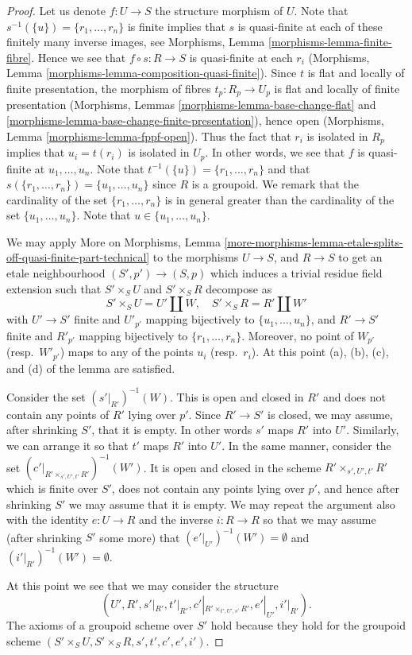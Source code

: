 \begin{proof}
Let us denote $f : U \to S$ the structure morphism of $U$.
Note that $s^{-1}(\{u\}) = \{r_1, \ldots, r_n\}$
is finite implies that $s$ is quasi-finite
at each of these finitely many inverse images, see
Morphisms, Lemma \ref{morphisms-lemma-finite-fibre}.
Hence we see that $f \circ s : R \to S$ is quasi-finite at each $r_i$
(Morphisms, Lemma \ref{morphisms-lemma-composition-quasi-finite}).
Since $t$ is flat and locally of finite presentation,
the morphism of fibres $t_p : R_p \to U_p$ is flat and locally of
finite presentation (Morphisms,
Lemmas \ref{morphisms-lemma-base-change-flat} and
\ref{morphisms-lemma-base-change-finite-presentation}),
hence open (Morphisms,
Lemma \ref{morphisms-lemma-fppf-open}). Thus the fact that $r_i$ is isolated
in $R_p$ implies that $u_i = t(r_i)$ is isolated in $U_p$.
In other words, we see that $f$ is quasi-finite at $u_1, \ldots, u_n$.
Note that $t^{-1}(\{u\}) = \{r_1, \ldots, r_n\}$ and that
$s(\{r_1, \ldots, r_n\}) = \{u_1, \ldots, u_n\}$ since $R$ is a
groupoid. We remark that the cardinality of the set
$\{r_1, \ldots, r_n\}$ is in general greater than the cardinality
of the set $\{u_1, \ldots, u_n\}$. Note that $u \in \{u_1, \ldots, u_n\}$.

\medskip\noindent
We may apply
More on Morphisms,
Lemma \ref{more-morphisms-lemma-etale-splits-off-quasi-finite-part-technical}
to the morphisms
$U \to S$, and $R \to S$ to get an etale neighbourhood
$(S', p') \to (S, p)$ which induces a trivial residue field extension
such that $S' \times_S U$ and $S' \times_S R$ decompose as
$$
S' \times_S U = U' \coprod W, \quad
S' \times_S R = R' \coprod W'
$$
with $U' \to S'$ finite and
$U'_{p'}$ mapping bijectively to $\{u_1, \ldots, u_n\}$, and
$R' \to S'$ finite and
$R'_{p'}$ mapping bijectively to $\{r_1, \ldots, r_n\}$.
Moreover, no point of $W_{p'}$ (resp.\ $W'_{p'}$) maps to
any of the points $u_i$ (resp.\ $r_i$). At this point (a), (b), (c), and (d)
of the lemma are satisfied.

\medskip\noindent
Consider the set $(s'|_{R'})^{-1}(W)$. This is open and closed in $R'$
and does not contain any points of $R'$ lying over $p'$. Since
$R' \to S'$ is closed, we may assume, after shrinking $S'$, that
it is empty. In other words $s'$ maps $R'$ into $U'$.
Similarly, we can arrange it so that $t'$ maps $R'$ into $U'$.
In the same manner, consider the set
$(c'|_{R' \times_{s', U', t'} R'})^{-1}(W')$.
It is open and closed in the scheme $R' \times_{s', U', t'} R'$
which is finite over $S'$, does not contain any points lying
over $p'$, and hence after shrinking $S'$ we may assume
that it is empty. We may repeat the argument also with the identity
$e : U \to R$ and the inverse $i : R \to R$ so that we may assume
(after shrinking $S'$ some more) that $(e'|_{U'})^{-1}(W') = \emptyset$
and $(i'|_{R'})^{-1}(W') = \emptyset$.

\medskip\noindent
At this point we see that we may consider the structure
$$
(U', R', s'|_{R'}, t'|_{R'}, c'|_{R' \times_{t', U', s'} R'},
e'|_{U'}, i'|_{R'}).
$$
The axioms of a groupoid scheme over $S'$ hold
because they hold for the groupoid scheme
$(S' \times_S U, S' \times_S R, s', t', c', e', i')$.
\end{proof}

